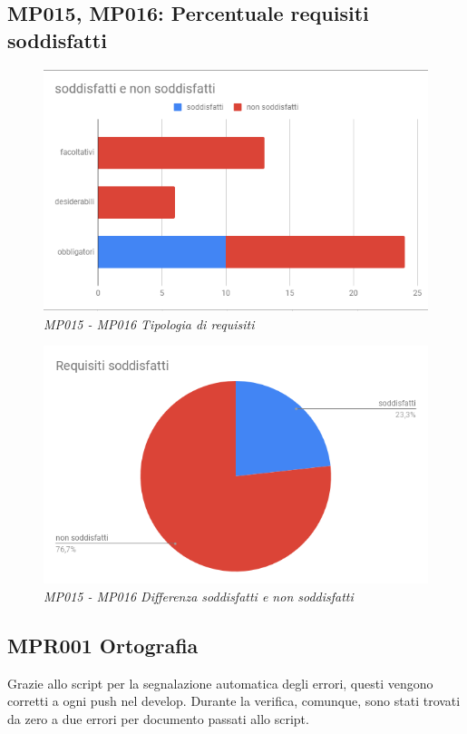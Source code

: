 \subsection{MP015, MP016: Percentuale requisiti soddisfatti}
\begin{figure} [h]
    \centering
	\includegraphics[scale=0.5]{./images/req.PNG}
    \caption{\textit{MP015 - MP016 Tipologia di requisiti}}
\end{figure}
\begin{figure} [h]
    \centering
	\includegraphics[scale=0.5]{./images/RequisitiSoddisfatti.png}
    \caption{\textit{MP015 - MP016 Differenza soddisfatti e non soddisfatti}}
\end{figure}
\subsection{MPR001 Ortografia}
Grazie allo script per la segnalazione automatica degli errori, questi vengono corretti a ogni push nel develop. Durante la verifica, comunque, sono stati trovati da zero a due errori per documento passati allo script. 

